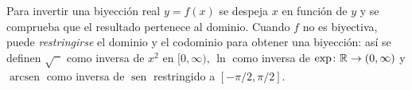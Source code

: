 Para invertir una biyección real $y=f(x)$ se despeja $x$ en función de $y$ y se comprueba que el resultado pertenece al dominio. Cuando $f$ no es biyectiva, puede \emph{restringirse} el dominio y el codominio para obtener una biyección: así se definen $\sqrt{\phantom{x}}$ como inversa de $x^{2}$ en $[0,\infty)$, $\ln$ como inversa de $\exp\colon\mathbb{R}\to(0,\infty)$ y $\operatorname{arcsen}$ como inversa de $\operatorname{sen}$ restringido a $[-\pi/2,\pi/2]$.

\addtocounter{definicion}{1}%

\addtocounter{definicion}{1}%

\addtocounter{definicion}{1}%

